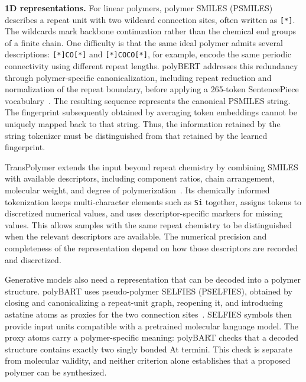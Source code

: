 \textbf{1D representations.}
For linear polymers, polymer SMILES (PSMILES) describes a repeat unit with two wildcard connection sites, often written as \texttt{[*]}. The wildcards mark backbone continuation rather than the chemical end groups of a finite chain. One difficulty is that the same ideal polymer admits several descriptions: \texttt{[*]CO[*]} and \texttt{[*]COCO[*]}, for example, encode the same periodic connectivity using different repeat lengths. polyBERT addresses this redundancy through polymer-specific canonicalization, including repeat reduction and normalization of the repeat boundary, before applying a 265-token SentencePiece vocabulary~\citep{kuenneth2023polybert}. The resulting sequence represents the canonical PSMILES string. The fingerprint subsequently obtained by averaging token embeddings cannot be uniquely mapped back to that string. Thus, the information retained by the string tokenizer must be distinguished from that retained by the learned fingerprint.

TransPolymer extends the input beyond repeat chemistry by combining SMILES with available descriptors, including component ratios, chain arrangement, molecular weight, and degree of polymerization~\citep{xu2023transpolymer}. Its chemically informed tokenization keeps multi-character elements such as \texttt{Si} together, assigns tokens to discretized numerical values, and uses descriptor-specific markers for missing values. This allows samples with the same repeat chemistry to be distinguished when the relevant descriptors are available. The numerical precision and completeness of the representation depend on how those descriptors are recorded and discretized.

Generative models also need a representation that can be decoded into a polymer structure. polyBART uses pseudo-polymer SELFIES (PSELFIES), obtained by closing and canonicalizing a repeat-unit graph, reopening it, and introducing astatine atoms as proxies for the two connection sites~\citep{savit2025polybart}. SELFIES symbols then provide input units compatible with a pretrained molecular language model. The proxy atoms carry a polymer-specific meaning: polyBART checks that a decoded structure contains exactly two singly bonded At termini. This check is separate from molecular validity, and neither criterion alone establishes that a proposed polymer can be synthesized.

